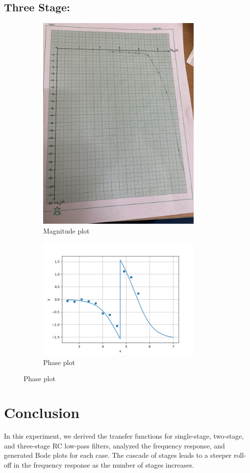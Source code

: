 \documentclass[a4paper,12pt]{article}
\begin{document}
\subsection{Three Stage:}
\pagebreak
\begin{figure}[h!]
	\begin{subfigure}[b]{100pt}
		\caption{Magnitude plot}
		\includegraphics[width = 230pt]{figs/fig5.png}
	\end{subfigure}
	\hspace{110pt}
	\begin{subfigure}[b]{100pt}
		\caption{Phase plot}
		\includegraphics[width = 230pt]{figs/fig6.png}
	\end{subfigure}
\end{figure}

\section{Conclusion}
In this experiment, we derived the transfer functions for single-stage, two-stage, and three-stage RC low-pass filters, analyzed the frequency response, and generated Bode plots for each case. The cascade of stages leads to a steeper roll-off in the frequency response as the number of stages increases.
\end{document}
